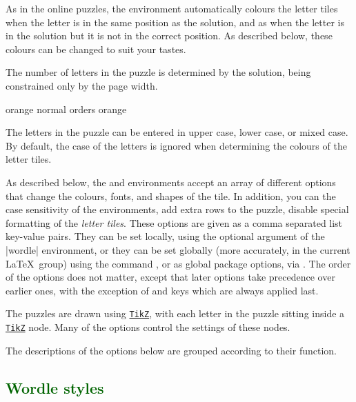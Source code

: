 \documentclass[svgnames]{report}
\newcommand\ctan[1]{\href{https://www.ctan.org/pkg/#1}{\texttt{#1}}}
\newcommand\Section[1]{\subsection{\textcolor{DarkGreen}{#1}}}
\begin{document}
  As in the online puzzles, the  environment
  automatically colours the letter tiles
  when the letter is in the same position as the solution, and as
   when
  the letter is in the solution but it is not in the correct position. As
  described below, these colours can be changed to suit your tastes.

  The number of letters in the puzzle is determined by the solution,
  being constrained only by the page width.

  \begin{example}
    \begin{wordle}[rows=4]{orange}
       normal
       orders
       orange
    \end{wordle}
  \end{example}

  The letters in the puzzle can be entered in upper case, lower case, or
  mixed case. By default, the case of the letters is ignored when
  determining the colours of the letter tiles.

  As described below, the  and 
  environments accept an array of different options that change the
  colours, fonts, and shapes of the tile. In addition, you can the case
  sensitivity of the environments, add extra rows to the puzzle, disable
  special formatting of the \textit{letter tiles}.  These options are
  given as a comma separated list key-value pairs.  They can be set
  locally, using the optional argument of the \keyword|wordle|
  environment, or they can be set globally (more accurately, in the
  current \LaTeX\ group) using the \keyword{\WordleSetup} command
  , or as global package options, via
  \keyword{\usepackage[options]{wordle}}.  The order of the options does
  not matter, except that later options take precedence over earlier
  ones, with the exception of  and  keys
  which are always applied last.

  The  puzzles are drawn using \ctan{TikZ}, with each
  letter in the puzzle sitting inside a \ctan{TikZ} node. Many of the
  options control the settings of these nodes.

  The descriptions of the options below are grouped according to their
  function.

  \Section{Wordle styles}
\end{document}

